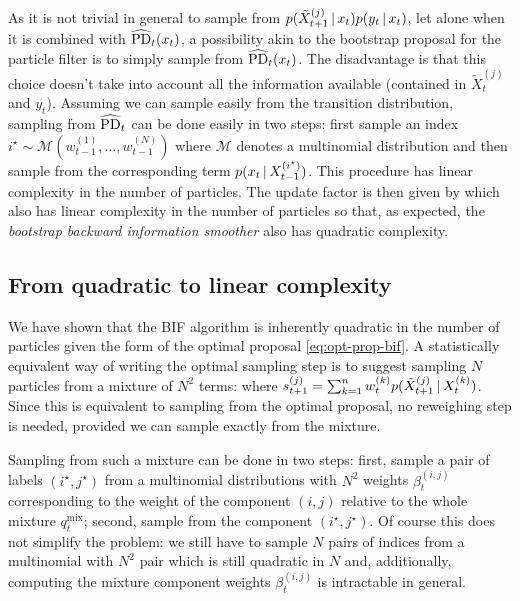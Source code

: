 As it is not trivial in general to sample from $p(\tilde X^{(j)}_{t+1}\,|\, x_{t})p(y_{t}\,|\, x_{t})$, let alone when it is combined with $\widehat{\text{PD}}_{t}(x_{t})$, a possibility akin to the bootstrap proposal for the particle filter is to simply sample from $\widehat{\text{PD}}_{t}(x_{t})$. The disadvantage is that this choice doesn't take into account all the information available (contained in $\tilde X^{(j)}_{t}$ and $y_{t}$). Assuming we can sample easily from the transition distribution, sampling from $\widehat{\text{PD}}_{t}$ can be done easily in two steps: first sample an index $i^{\star}\sim \mathcal M(w^{(1)}_{t-1}, \dots, w^{(N)}_{t-1})$ where $\mathcal M$ denotes a multinomial distribution and then sample from the corresponding term $p(x_{t}\,|\, X^{(i^{\star})}_{t-1})$. This procedure has linear complexity in the number of particles. The update factor is then given by
%
%
which also has linear complexity in the number of particles so that, as expected, the \emph{bootstrap backward information smoother} also has quadratic complexity.

\subsection{From quadratic to linear complexity}
%
We have shown that the BIF algorithm is inherently quadratic in the number of particles given the form of the optimal proposal \eqref{eq:opt-prop-bif}. A statistically equivalent way of writing the optimal sampling step is to suggest sampling $N$ particles from a mixture of $N^{2}$ terms: 
%
where $s^{(j)}_{t+1}=\sum_{k=1}^{n}w^{(k)}_{t}p(\tilde X^{(j)}_{t+1}\,|\, X^{(k)}_{t})$. Since this is equivalent to sampling from the optimal proposal, no reweighing step is needed, provided we can sample exactly from the mixture.
 
Sampling from such a mixture can be done in two steps: first, sample a pair of labels $(i^{\star},j^{\star})$ from a multinomial distributions with $N^{2}$ weights $\beta^{(i,j)}_{t}$ corresponding to the weight of the component $(i,j)$ relative to the whole mixture $q_{t}^{\text{mix}}$; second, sample from the component $(i^{\star},j^{\star})$. 
Of course this does not simplify the problem: we still have to sample $N$ pairs of indices from a multinomial with $N^{2}$ pair which is still quadratic in $N$ and, additionally, computing the mixture component weights $\beta^{(i,j)}_{t}$ is intractable in general. 

